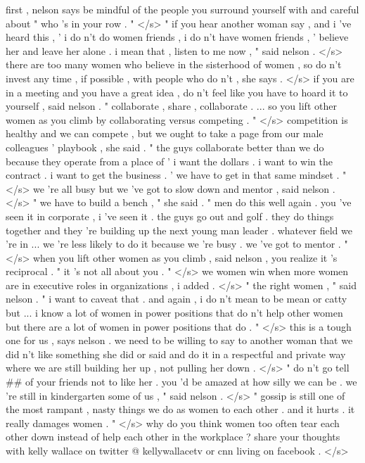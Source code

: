 \documentclass[12pt]{report}
\begin{document}
\begin{appendices}
first , nelson says be mindful of the people you surround yourself with and careful about " who 's in your row . " </s> " if you hear another woman say , and i 've heard this , ' i do n't do women friends , i do n't have women friends , ' believe her and leave her alone . i mean that , listen to me now , " said nelson . </s> there are too many women who believe in the sisterhood of women , so do n't invest any time , if possible , with people who do n't , she says . </s> if you are in a meeting and you have a great idea , do n't feel like you have to hoard it to yourself , said nelson . " collaborate , share , collaborate . ... so you lift other women as you climb by collaborating versus competing . " </s> competition is healthy and we can compete , but we ought to take a page from our male colleagues ' playbook , she said . " the guys collaborate better than we do because they operate from a place of ' i want the dollars . i want to win the contract . i want to get the business . ' we have to get in that same mindset . " </s> we 're all busy but we 've got to slow down and mentor , said nelson . </s> " we have to build a bench , " she said . " men do this well again . you 've seen it in corporate , i 've seen it . the guys go out and golf . they do things together and they 're building up the next young man leader . whatever field we 're in ... we 're less likely to do it because we 're busy . we 've got to mentor . " </s> when you lift other women as you climb , said nelson , you realize it 's reciprocal . " it 's not all about you . " </s> we women win when more women are in executive roles in organizations , i added . </s> " the right women , " said nelson . " i want to caveat that . and again , i do n't mean to be mean or catty but ... i know a lot of women in power positions that do n't help other women but there are a lot of women in power positions that do . " </s> this is a tough one for us , says nelson . we need to be willing to say to another woman that we did n't like something she did or said and do it in a respectful and private way where we are still building her up , not pulling her down . </s> " do n't go tell ## of your friends not to like her . you 'd be amazed at how silly we can be . we 're still in kindergarten some of us , " said nelson . </s> " gossip is still one of the most rampant , nasty things we do as women to each other . and it hurts . it really damages women . " </s> why do you think women too often tear each other down instead of help each other in the workplace ? share your thoughts with kelly wallace on twitter @ kellywallacetv or cnn living on facebook . </s>


\end{appendices}
\end{document}
